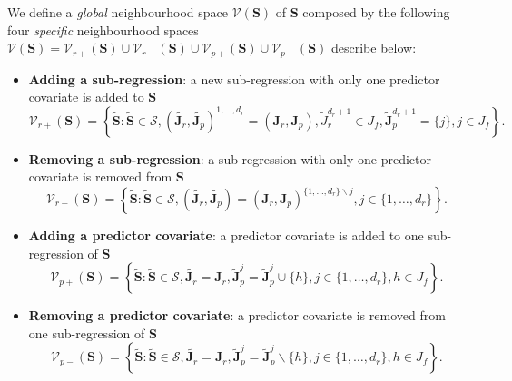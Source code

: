 \documentclass[11pt,a4paper]{article}
\begin{document}
We define a {\it global} neighbourhood space $\mathcal{V}(\boldsymbol{S})$ of $\boldsymbol{S}$ composed by the following four {\it specific} neighbourhood spaces $\mathcal{V}(\boldsymbol{S})=\mathcal{V}_{r+}(\boldsymbol{S})\cup\mathcal{V}_{r-}(\boldsymbol{S})\cup\mathcal{V}_{p+}(\boldsymbol{S})\cup\mathcal{V}_{p-}(\boldsymbol{S})$ describe below:
	\begin{itemize}
	\item {\bf Adding a sub-regression}: a new sub-regression with only one predictor covariate is added to $\boldsymbol{S}$
\begin{equation}
\mathcal{V}_{r+}(\boldsymbol{S}) = \left\{\tilde{\boldsymbol{S}}: \tilde{\boldsymbol{S}}\in\mathcal{S}, (\tilde{\boldsymbol{J}_r},\tilde{\boldsymbol{J}_p})^{1,\ldots,d_r}=(\boldsymbol{J}_r,\boldsymbol{J}_p), \tilde{J}_r^{d_r+1}\in J_f, \tilde{\boldsymbol{J}}_p^{d_r+1}=\{j\}, j\in J_f \right\}.
\end{equation}	
		\item {\bf Removing a sub-regression}: a sub-regression with only one predictor covariate is removed from $\boldsymbol{S}$
\begin{equation}
\mathcal{V}_{r-}(\boldsymbol{S}) = \left\{\tilde{\boldsymbol{S}}: \tilde{\boldsymbol{S}}\in\mathcal{S}, (\tilde{\boldsymbol{J}_r},\tilde{\boldsymbol{J}_p})=(\boldsymbol{J}_r,\boldsymbol{J}_p)^{\{1,\ldots,d_r\}\backslash j}, j\in\{1,\ldots,d_r\} \right\}.
\end{equation}	
	\item {\bf Adding a predictor covariate}: a predictor covariate is added to one sub-regression of $\boldsymbol{S}$
\begin{equation}
\mathcal{V}_{p+}(\boldsymbol{S}) = \left\{\tilde{\boldsymbol{S}}: \tilde{\boldsymbol{S}}\in\mathcal{S}, \tilde{\boldsymbol{J}_r}=\boldsymbol{J}_r, \tilde{\boldsymbol{J}}_p^{j}=\tilde{\boldsymbol{J}}_p^{j} \cup \{h\}, j\in \{1,\ldots,d_r\}, h\in J_f \right\}.
\end{equation}
	\item {\bf Removing a predictor covariate}: a predictor covariate is removed from one sub-regression of $\boldsymbol{S}$
\begin{equation}
\mathcal{V}_{p-}(\boldsymbol{S}) = \left\{\tilde{\boldsymbol{S}}: \tilde{\boldsymbol{S}}\in\mathcal{S}, \tilde{\boldsymbol{J}_r}=\boldsymbol{J}_r, \tilde{\boldsymbol{J}}_p^{j}=\tilde{\boldsymbol{J}}_p^{j} \backslash \{h\}, j\in \{1,\ldots,d_r\}, h\in J_f \right\}.
\end{equation}	
	\end{itemize}
\end{document}
